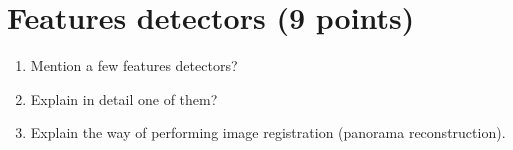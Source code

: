 \section{Features detectors (9 points)}
\begin{qbox}
\begin{enumerate}
 \item Mention a few features detectors?
 \item Explain in detail one of them?
 \item Explain the way of performing image registration (panorama reconstruction).
\end{enumerate}
\end{qbox}

